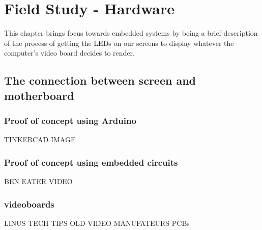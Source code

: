 \chapter*{Field Study - Hardware}

    This chapter brings focus towards embedded systems by being a brief description of the process of getting the LEDs on our screens to display whatever the computer's video board decides to render. 

    \section*{The connection between screen and motherboard}
        \subsection*{Proof of concept using Arduino}
            TINKERCAD IMAGE
        \subsection*{Proof of concept using embedded circuits}
            BEN EATER VIDEO
        \subsection*{videoboards}
            LINUS TECH TIPS OLD VIDEO MANUFATEURS PCBs








